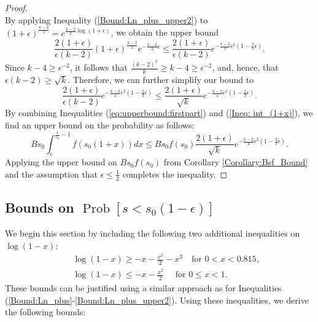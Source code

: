 \documentclass[twoside,11pt]{article}
\newcommand{\pP}[1]{\operatorname{Prob}\left[ #1 \right] }
\begin{document}
\begin{proof}
$$						$$	
						By applying Inequality (\ref{Bound:Ln_plus_upper2}) to $(1+\epsilon)^{\frac{k-2}{2}} = e^{\frac{k-2}{2}\log (1+\epsilon)}$, we obtain the upper bound
						\[\frac{2(1+\epsilon)}{\epsilon(k-2)} (1+\epsilon)^{\frac{k-2}{2}} e^{-\frac{k-2}{2}\epsilon} \leq \frac{2(1+\epsilon)}{\epsilon(k-2)} e^{-\frac{k-2}
						{4}\epsilon^2(1-\frac{2}{3}\epsilon)}.\]
						Since $k-4\geq \epsilon^{-2}$, it follows that $\frac{(k-2)^2}{k}\geq k-4\geq\epsilon^{-2}$, and, hence, that $\epsilon(k-2)\geq \sqrt{k}$.  Therefore, we can further simplify our bound to 
						\begin{equation}
							 \frac{2(1+\epsilon)}{\epsilon(k-2)} e^{-\frac{k-2}{4}\epsilon^2(1-\frac{2}{3}\epsilon)} \leq 
							\frac{2(1+\epsilon)}{\sqrt{k}} e^{-\frac{k-2}{4}\epsilon^2(1-\frac{2}{3}\epsilon)}. 
							\label{Ineq: int_(1+x)}
						\end{equation} 			
						By combining Inequalities (\ref{eq:upperbound:firstpart}) and (\ref{Ineq: int_(1+x)}), we find an upper bound on the probability as follows:
						$$
						Bs_0\int_\epsilon^{\frac{1}{s_0}-1}f(s_0(1+x))dx\leq B s_0 f(s_0)   \frac{2(1+\epsilon)}{\sqrt{k}} e^{-\frac{k-2}{4}\epsilon^2(1-\frac{2}{3}\epsilon)}.
						$$
Applying the upper bound on $Bs_0f(s_0)$ from Corollary \ref{Corollary:Bsf_Bound} and the assumption that $\epsilon\leq\frac{1}{2}$ completes the inequality.
				\end{proof}
			
								
	
	
\subsection{Bounds on \texorpdfstring{$\pP{s<s_0(1-\epsilon)}$}{Prob[s<s0(1-epsilon)} }
		
We begin this section by including the following two additional inequalities on $\log(1-x)$:
		\begin{eqnarray}
		& & \log (1-x) \geq -x -\frac{x^2}{2}-x^3 \quad \text{for $0<x<0.815$},  \label{Bound:Ln_minus} \\
		&& \log(1-x)\leq -x-\frac{x^2}{2}\quad\text{ for }0\leq x<1.		 \label{Bound:Ln:minus:upper}
		\end{eqnarray}
These bounds can be justified using a similar approach as for Inequalities (\ref{Bound:Ln_plus}-\ref{Bound:Ln_plus_upper2}).  Using these inequalities, we derive the following bounds:
		
\end{document}
